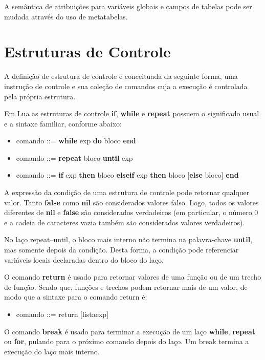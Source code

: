 \documentclass[
12pt, %
openright, %
oneside, %
a4paper, %
english, %
brazil, %
]{abntex2}
\begin{document}
A semântica de atribuições para variáveis globais e campos de tabelas pode ser mudada através do uso de metatabelas.

\chapter{Estruturas de Controle}
A definição de estrutura de controle é conceituada da seguinte forma, uma instrução de controle e sua coleção de comandos cuja a execução é controlada pela própria estrutura.

Em Lua as estruturas de controle \textbf{if}, \textbf{while} e \textbf{repeat} possuem o significado usual e a sintaxe familiar, conforme abaixo:

\begin{itemize}
\item comando ::= \textbf{while} exp \textbf{do} bloco \textbf{end}
\item comando ::= \textbf{repeat} bloco \textbf{until} exp
\item comando ::= \textbf{if} exp \textbf{then} bloco {\textbf{elseif} exp \textbf{then} bloco} [\textbf{else} bloco] \textbf{end}
\end{itemize}

A expressão da condição de uma estrutura de controle pode retornar qualquer valor. Tanto \textbf{false} como \textbf{nil} são considerados valores falso. Logo, todos os valores diferentes de \textbf{nil} e \textbf{false} são considerados verdadeiros (em particular, o número 0 e a cadeia de caracteres vazia também são considerados valores verdadeiros).

No laço repeat–until, o bloco mais interno não termina na palavra-chave \textbf{until}, mas somente depois da condição. Desta forma, a condição pode referenciar variáveis locais declaradas dentro do bloco do laço.

O comando \textbf{return} é usado para retornar valores de uma função ou de um trecho de função. Sendo que, funções e trechos podem retornar mais de um valor, de modo que a sintaxe para o comando return é:

\begin{itemize}
\item comando ::= return [listaexp]
\end{itemize}

O comando \textbf{break} é usado para terminar a execução de um laço \textbf{while}, \textbf{repeat} ou \textbf{for}, pulando para o próximo comando depois do laço. Um break termina a execução do laço mais interno.
\end{document}
